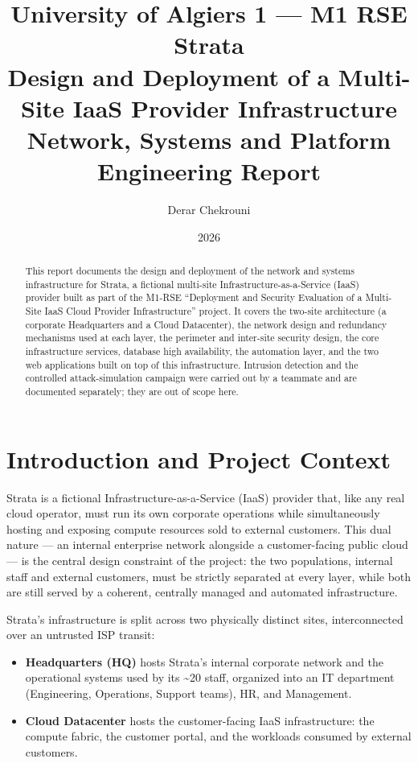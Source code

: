 \documentclass[11pt,a4paper]{report}
\title{
  \Large University of Algiers 1 --- M1 RSE \\[1em]
  \Huge\bfseries Strata \\[0.3em]
  \Large Design and Deployment of a Multi-Site IaaS Provider Infrastructure \\[1em]
  \large Network, Systems and Platform Engineering Report
}
\author{Derar Chekrouni}
\date{2026}
\begin{document}
\maketitle

\begin{abstract}
\noindent
This report documents the design and deployment of the network and systems
infrastructure for Strata, a fictional multi-site Infrastructure-as-a-Service
(IaaS) provider built as part of the M1-RSE ``Deployment and Security
Evaluation of a Multi-Site IaaS Cloud Provider Infrastructure'' project. It
covers the two-site architecture (a corporate Headquarters and a Cloud
Datacenter), the network design and redundancy mechanisms used at each layer,
the perimeter and inter-site security design, the core infrastructure
services, database high availability, the automation layer, and the two
web applications built on top of this infrastructure. Intrusion detection
and the controlled attack-simulation campaign were carried out by a
teammate and are documented separately; they are out of scope here.
\end{abstract}

\tableofcontents

\chapter{Introduction and Project Context}

Strata is a fictional Infrastructure-as-a-Service (IaaS) provider that, like
any real cloud operator, must run its own corporate operations while
simultaneously hosting and exposing compute resources sold to external
customers. This dual nature --- an internal enterprise network alongside a
customer-facing public cloud --- is the central design constraint of the
project: the two populations, internal staff and external customers, must be
strictly separated at every layer, while both are still served by a coherent,
centrally managed and automated infrastructure.

Strata's infrastructure is split across two physically distinct sites,
interconnected over an untrusted ISP transit:

\begin{itemize}[leftmargin=1.5em]
  \item \textbf{Headquarters (HQ)} hosts Strata's internal corporate network
    and the operational systems used by its \textasciitilde20 staff, organized
    into an IT department (Engineering, Operations, Support teams), HR, and
    Management.
  \item \textbf{Cloud Datacenter} hosts the customer-facing IaaS
    infrastructure: the compute fabric, the customer portal, and the
    workloads consumed by external customers.
\end{itemize}
\end{document}
